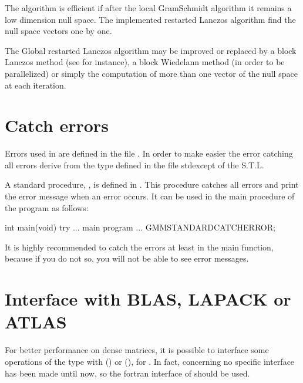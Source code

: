 \documentclass[a4paper,11pt,english]{sphinxmanual}
\begin{document}
The algorithm is efficient if after the local Gram\sphinxhyphen{}Schmidt algorithm it remains a low dimension null space. The implemented restarted Lanczos algorithm find the null space vectors one by one.

The Global restarted Lanczos algorithm may be improved or replaced by
a block Lanczos method (see  for instance), a block
Wiedelann method (in order to be parallelized) or simply
the computation of more than one vector of the null space at each
iteration.


\chapter{Catch errors}
\label{\detokenize{gmm/catch:catch-errors}}\label{\detokenize{gmm/catch:gmm-catch}}\label{\detokenize{gmm/catch::doc}}
Errors used in  are defined in the file . In order to make easier  the error catching all errors derive from the type  defined in the file \textasciigrave{}\textasciigrave{} stdexcept\textasciigrave{}\textasciigrave{} of the S.T.L.

A standard procedure, , is defined in . This procedure catches all errors and print the error message when an error occurs. It can be used in the main procedure of the program as follows:

\begin{sphinxVerbatim}[commandchars=\\\{\}]
int main(void) \PYGZob{}
  try \PYGZob{}
    ... main program ...
      \PYGZcb{}
   GMM\PYGZus{}STANDARD\PYGZus{}CATCH\PYGZus{}ERROR;
\PYGZcb{}
\end{sphinxVerbatim}

It is highly recommended to catch the errors at least in the main function, because if you do not so, you will not be able to see error messages.


\chapter{Interface with BLAS, LAPACK or ATLAS}
\label{\detokenize{gmm/blas_interface:interface-with-blas-lapack-or-atlas}}\label{\detokenize{gmm/blas_interface:gmm-lapack}}\label{\detokenize{gmm/blas_interface::doc}}
For better performance on dense matrices, it is possible to interface some operations of the type  with  () or  (), for . In fact, concerning  no specific interface has been made until now, so the fortran interface of  should be used.
\end{document}
